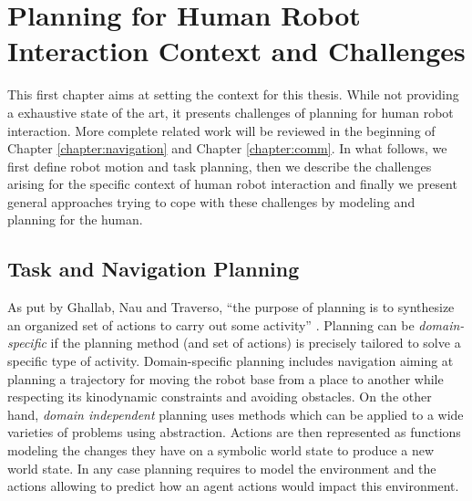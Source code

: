 \documentclass[a4paper,11pt,twoside]{StyleThese}
\begin{document}
\setcounter{chapter}{0} %
\dominitoc
\faketableofcontents
\fi

\chapter{Planning for Human Robot Interaction Context and Challenges}
\label{chapter:sota}
\minitoc


This first chapter aims at setting the context for this thesis. While not providing a exhaustive state of the art, it presents challenges of planning for human robot interaction. More complete related work will be reviewed in the beginning of Chapter \ref{chapter:navigation} and Chapter \ref{chapter:comm}. In what follows, we first define robot motion and task planning, then we describe the challenges arising for the specific context of human robot interaction and finally we present general approaches trying to cope with these challenges by modeling and planning for the human.

\section{Task and Navigation Planning}
As put by Ghallab, Nau and Traverso, ``the purpose of planning is to synthesize an organized set of actions to carry out some activity'' \cite{ghallab_nau_traverso_2016}. Planning can be \textit{domain-specific} if the planning method (and set of actions) is precisely tailored to solve a specific type of activity. Domain-specific planning includes navigation aiming at planning a trajectory for moving the robot base from a place to another while respecting its kinodynamic constraints and avoiding obstacles. On the other hand, \textit{domain independent} planning uses methods which can be applied to a wide varieties of problems using abstraction. Actions are then represented as functions modeling the changes they have on a symbolic world state to produce a new world state. In any case planning requires to model the environment and the actions allowing to predict how an agent actions would impact this environment.
\end{document}
